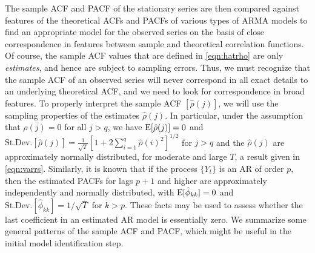 The sample ACF and PACF of the stationary series are then compared against features of the theoretical ACFs and PACFs of various types of ARMA models to find an appropriate model for the observed series on the basis of close correspondence in features between sample and theoretical correlation functions. Of course, the sample ACF values that are defined in \eqref{eqn:hatrho} are only \emph{estimates}, and hence are subject to sampling errors. Thus, we must recognize that the sample ACF of an observed series will never correspond in all exact details to an underlying theoretical ACF, and we need to look for correspondence in broad features. To properly interpret the sample ACF $[\hat{\rho}(j)]$, we will use the sampling properties of the estimates $\hat{\rho}(j)$. In particular, under the assumption that $\rho(j) = 0$ for all $j  > q$, we have $\operatorname{E}[\hat{\rho}(j)]= 0$ and $\text{St.Dev.}[\hat{\rho}(j)]= \frac{1}{\sqrt{T}}[1 + 2 \sum_{i=1}^q \hat{\rho}(i)^2]^{1/2}$ for $j > q$ and the $\hat{\rho}(j)$ are approximately normally distributed, for moderate and large $T$, a result given in \eqref{eqn:varrs}. Similarly, it is known that if the process $\{Y_t\}$ is an AR of order $p$, then the estimated PACFs for lags $p + 1$ and higher are approximately independently and normally distributed, with $\operatorname{E}[\hat{\phi}_{kk}] = 0$ and $\text{St.Dev.}[\hat{\phi}_{kk}] = 1/\sqrt{T}$ for $k > p$. These facts may be used to assess whether the last coefficient in an estimated AR model is essentially zero. We summarize some general patterns of the sample ACF and PACF, which might be useful in the initial model identification step. 


